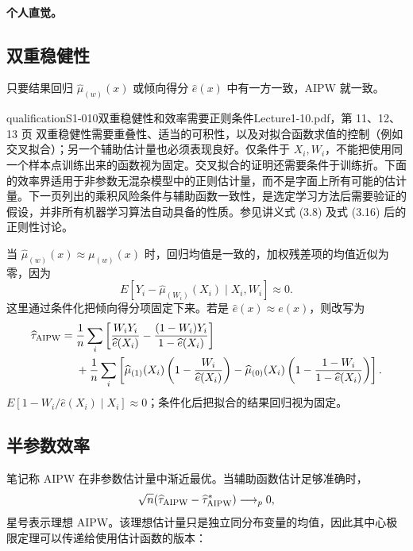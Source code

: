 \paragraph{个人直觉。}
\subsection{双重稳健性}
只要结果回归 $\widehat\mu_{(w)}(x)$ 或倾向得分 $\widehat e(x)$ 中有一方一致，AIPW 就一致。
\begin{reviewnote}{qualification}{S1-010}{双重稳健性和效率需要正则条件}{Lecture1-10.pdf，第 11、12、13 页}
双重稳健性需要重叠性、适当的可积性，以及对拟合函数求值的控制（例如交叉拟合）；另一个辅助估计量也必须表现良好。仅条件于 $X_i,W_i$，不能把使用同一个样本点训练出来的函数视为固定。交叉拟合的证明还需要条件于训练折。下面的效率界适用于非参数无混杂模型中的正则估计量，而不是字面上所有可能的估计量。下一页列出的乘积风险条件与辅助函数一致性，是选定学习方法后需要验证的假设，并非所有机器学习算法自动具备的性质。参见讲义式 (3.8) 及式 (3.16) 后的正则性讨论。
\end{reviewnote}

当 $\widehat\mu_{(w)}(x)\approx\mu_{(w)}(x)$ 时，回归均值是一致的，加权残差项的均值近似为零，因为
\[
E[Y_i-\widehat\mu_{(W_i)}(X_i)\mid X_i,W_i]\approx0.
\]
这里通过条件化把倾向得分项固定下来。若是 $\widehat e(x)\approx e(x)$，则改写为
\begin{align*}
\widehat\tau_{\rm AIPW}={}&\frac1n\sum_i\left[\frac{W_iY_i}{\widehat e(X_i)}
-\frac{(1-W_i)Y_i}{1-\widehat e(X_i)}\right]\\
&+\frac1n\sum_i\left[\widehat\mu_{(1)}(X_i)\left(1-\frac{W_i}{\widehat e(X_i)}\right)
-\widehat\mu_{(0)}(X_i)\left(1-\frac{1-W_i}{1-\widehat e(X_i)}\right)\right].
\end{align*}
$E[1-W_i/\widehat e(X_i)\mid X_i]\approx0$；条件化后把拟合的结果回归视为固定。
\subsection{半参数效率}
笔记称 AIPW 在非参数估计量中渐近最优。当辅助函数估计足够准确时，
\[
\sqrt n(\widehat\tau_{\rm AIPW}-\widehat\tau^*_{\rm AIPW})\longrightarrow_p0,
\]
星号表示理想 AIPW。该理想估计量只是独立同分布变量的均值，因此其中心极限定理可以传递给使用估计函数的版本：

